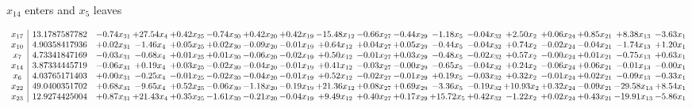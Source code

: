 \documentclass[9pt]{article}
\begin{document}
 $ x_{14} $ enters and $ x_{5} $ leaves 

 \[\begin{array}{c| c c@{\hskip 2pt} c@{\hskip 2pt} c@{\hskip 2pt} c@{\hskip 2pt} c@{\hskip 2pt} c@{\hskip 2pt} c@{\hskip 2pt} c@{\hskip 2pt} c@{\hskip 2pt} c@{\hskip 2pt} c@{\hskip 2pt} c@{\hskip 2pt} c@{\hskip 2pt} c@{\hskip 2pt} c@{\hskip 2pt} c@{\hskip 2pt} }
 x_{17}   &  13.1787587782 & -0.74 x_{31} & + 27.54 x_{4} & +  0.42 x_{25} & -0.74 x_{30} & +  0.42 x_{20} & +  0.42 x_{19} & -15.48 x_{12} & -0.66 x_{27} & -0.44 x_{29} & -1.18 x_{5} & -0.04 x_{32} & +  2.50 x_{2} & +  0.06 x_{24} & +  0.85 x_{21} & +  8.38 x_{13} & -3.63 x_{1}\\
 x_{10}   &  4.90358417936 & +  0.02 x_{31} & -1.46 x_{4} & +  0.05 x_{25} & +  0.02 x_{30} & -0.09 x_{20} & -0.01 x_{19} & +  0.64 x_{12} & +  0.04 x_{27} & +  0.05 x_{29} & -0.44 x_{5} & -0.04 x_{32} & +  0.74 x_{2} & -0.02 x_{24} & -0.04 x_{21} & -1.74 x_{13} & +  1.20 x_{1}\\
 x_{7}   &  4.73341847169 & -0.03 x_{31} & -0.68 x_{4} & +  0.01 x_{25} & +  0.01 x_{30} & -0.06 x_{20} & -0.02 x_{19} & +  0.50 x_{12} & -0.01 x_{27} & +  0.03 x_{29} & -0.48 x_{5} & -0.02 x_{32} & +  0.57 x_{2} & -0.00 x_{24} & +  0.01 x_{21} & -0.75 x_{13} & +  0.63 x_{1}\\
 x_{14}   &  3.87334445719 & -0.06 x_{31} & +  0.19 x_{4} & +  0.03 x_{25} & -0.02 x_{30} & -0.04 x_{20} & -0.01 x_{19} & +  0.41 x_{12} & -0.03 x_{27} & -0.00 x_{29} & -0.65 x_{5} & -0.04 x_{32} & +  0.24 x_{2} & -0.06 x_{24} & +  0.06 x_{21} & -0.01 x_{13} & -0.00 x_{1}\\
 x_{6}   &  4.03765171403 & +  0.00 x_{31} & -0.25 x_{4} & -0.01 x_{25} & -0.02 x_{30} & -0.04 x_{20} & -0.01 x_{19} & +  0.52 x_{12} & -0.02 x_{27} & -0.01 x_{29} & +  0.19 x_{5} & -0.03 x_{32} & +  0.32 x_{2} & -0.01 x_{24} & +  0.02 x_{21} & -0.09 x_{13} & -0.33 x_{1}\\
 x_{22}   &  49.0400351702 & +  0.68 x_{31} & -9.65 x_{4} & +  0.52 x_{25} & -0.06 x_{30} & -1.18 x_{20} & -0.19 x_{19} & + 21.36 x_{12} & +  0.08 x_{27} & +  0.69 x_{29} & -3.36 x_{5} & -0.19 x_{32} & + 10.93 x_{2} & +  0.32 x_{24} & -0.09 x_{21} & -29.58 x_{13} & +  8.54 x_{1}\\
 x_{23}   &  12.9274425004 & +  0.87 x_{31} & + 21.43 x_{4} & +  0.35 x_{25} & -1.61 x_{30} & -0.21 x_{20} & -0.04 x_{19} & +  9.49 x_{12} & +  0.40 x_{27} & +  0.17 x_{29} & + 15.72 x_{5} & +  0.42 x_{32} & -1.22 x_{2} & +  0.02 x_{24} & +  0.43 x_{21} & -19.91 x_{13} & -5.86 x_{1}\\

\end{array}\]
\end{document}
